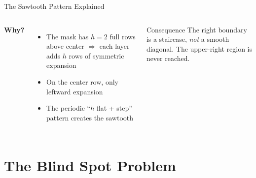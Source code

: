 \documentclass[aspectratio=169, 11pt]{beamer}
\begin{document}
\begin{frame}{The Sawtooth Pattern Explained}
\begin{columns}[c]
\vspace{0.3cm}
\textbf{Why?}
\begin{itemize}
    \item The mask has $h=2$ full rows above center $\Rightarrow$ each layer adds $h$ rows of symmetric expansion
    \item On the center row, only leftward expansion
    \item The periodic ``$h$ flat + step'' pattern creates the sawtooth
\end{itemize}

\vspace{0.3cm}
\begin{block}{Consequence}
The right boundary is a staircase, \emph{not} a smooth diagonal. The upper-right region is never reached.
\end{block}
\end{columns}
\end{frame}

\section{The Blind Spot Problem}
\end{document}
